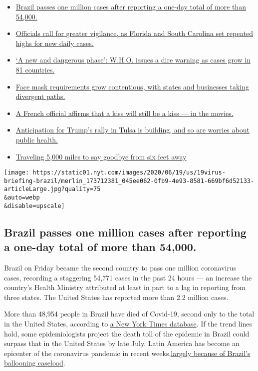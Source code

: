 \begin{itemize}
\tightlist
\item
  \protect\hyperlink{link-165a4135}{Brazil passes one million cases
  after reporting a one-day total of more than 54,000.}
\item
  \protect\hyperlink{link-510cd1a4}{Officials call for greater
  vigilance, as Florida and South Carolina set repeated highs for new
  daily cases.}
\item
  \protect\hyperlink{link-6db5071b}{`A new and dangerous phase': W.H.O.
  issues a dire warning as cases grow in 81 countries.}
\item
  \protect\hyperlink{link-29c5ce02}{Face mask requirements grow
  contentious, with states and businesses taking divergent paths.}
\item
  \protect\hyperlink{link-2748bcc4}{A French official affirms that a
  kiss will still be a kiss --- in the movies.}
\item
  \protect\hyperlink{link-bfd0690}{Anticipation for Trump's rally in
  Tulsa is building, and so are worries about public health.}
\item
  \protect\hyperlink{link-44a77124}{Traveling 5,000 miles to say goodbye
  from six feet away}
\end{itemize}

\texttt{[image: https://static01.nyt.com/images/2020/06/19/us/19virus-briefing-brazil/merlin\_173712381\_045ee062-0fb9-4e93-8581-669bf6d52133-articleLarge.jpg?quality=75\\\&auto=webp\\\&disable=upscale]}

\hypertarget{brazil-passes-one-million-cases-after-reporting-a-one-day-total-of-more-than-54000}{%
\subsection{Brazil passes one million cases after reporting a one-day
total of more than
54,000.}\label{brazil-passes-one-million-cases-after-reporting-a-one-day-total-of-more-than-54000}}

Brazil on Friday became the second country to pass one million
coronavirus cases, recording a staggering 54,771 cases in the past 24
hours --- an increase the country's Health Ministry attributed at least
in part to a lag in reporting from three states. The United States has
reported more than 2.2 million cases.

More than 48,954 people in Brazil have died of Covid-19, second only to
the total in the United States, according to
\href{https://www.nytimes.com/interactive/2020/world/americas/brazil-coronavirus-cases.html}{a
New York Times database}. If the trend lines hold, some epidemiologists
project the death toll of the epidemic in Brazil could surpass that in
the United States by late July. Latin America has become an epicenter of
the coronavirus pandemic in recent
weeks,\href{https://www.nytimes.com/article/brazil-coronavirus-cases.html}{largely
because of Brazil's ballooning caseload}.

